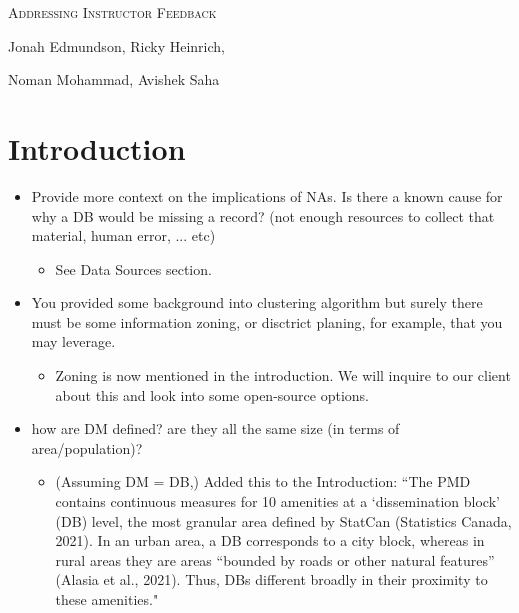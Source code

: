 \documentclass[11pt, a4paper]{article}
\begin{document}
\begin{center}
\Large{\textsc{Addressing Instructor Feedback}}
\par
\vspace{1.5pc}
\par
\small
Jonah Edmundson, Ricky Heinrich, \par Noman Mohammad, Avishek Saha
\end{center}
\vspace{2pc} %
\normalsize



\section*{Introduction}

\begin{itemize}
\item Provide more context on the implications of NAs. Is there a known cause for why a DB would be missing a record? (not enough resources to collect that material, human error, ... etc)
\begin{itemize}
\item See Data Sources section. 
\end{itemize}
\item You provided some background into clustering algorithm but surely there must be some information zoning, or disctrict planing, for example, that you may leverage.
\begin{itemize}
\item Zoning is now mentioned in the introduction. We will inquire to our client about this and look into some open-source options. 
\end{itemize}
\item how are DM defined? are they all the same size (in terms of area/population)? 
\begin{itemize}
\item (Assuming DM = DB,) Added this to the Introduction: ``The PMD
contains continuous measures for 10 amenities at a `dissemination block’ (DB) level, the most granular area defined by StatCan (Statistics Canada, 2021). In an urban area, a DB corresponds to a city block, whereas in rural areas they are areas ``bounded by roads or other natural features” (Alasia et al., 2021). Thus, DBs different broadly in their proximity to these amenities."
\end{itemize}
\end{itemize}
\end{document}
